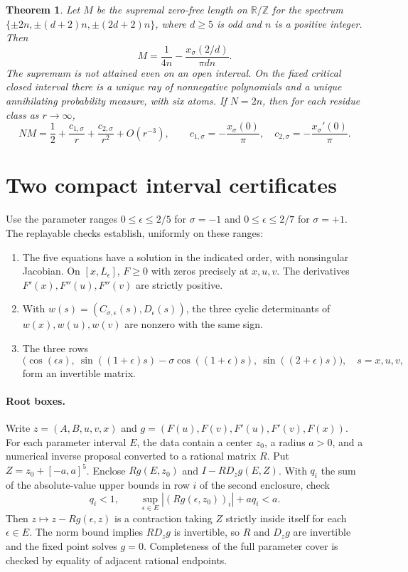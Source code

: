 \documentclass[11pt]{article}
\newtheorem{theorem}{Theorem}
\begin{document}
\begin{theorem}\label{thm:half}
Let \(M\) be the supremal zero-free length on \(\mathbb R/\mathbb Z\)
for the spectrum \(\{\pm 2n,\pm(d+2)n,\pm(2d+2)n\}\), where \(d\ge5\)
is odd and \(n\) is a positive integer. Then
\[
 M=\frac1{4n}-\frac{x_\sigma(2/d)}{\pi dn}.
\]
The supremum is not attained even on an open interval. On the fixed
critical closed interval there is a unique ray of nonnegative
polynomials and a unique annihilating probability measure,
with six atoms. If \(N=2n\), then for each residue class as \(r\to\infty\),
\[
 NM=\frac12+\frac{c_{1,\sigma}}{r}+
               \frac{c_{2,\sigma}}{r^2}+O(r^{-3}),\qquad
 c_{1,\sigma}=-\frac{x_\sigma(0)}{\pi},\quad
 c_{2,\sigma}=-\frac{x_\sigma'(0)}{\pi}.
\]
\end{theorem}

\section{Two compact interval certificates}\label{sec:interval}
Use the parameter ranges \(0\le\epsilon\le 2/5\) for \(\sigma=-1\)
and \(0\le\epsilon\le 2/7\) for \(\sigma=+1\).
The replayable checks establish, uniformly on these ranges:
\begin{enumerate}
\item The five equations have a solution in the indicated order,
with nonsingular Jacobian.
On \([x,L_\epsilon]\), \(F\ge0\) with zeros precisely at \(x,u,v\).
The derivatives \(F'(x),F''(u),F''(v)\) are strictly positive.
\item With \(w(s)=(C_{\sigma,\epsilon}(s),D_\epsilon(s))\), the
three cyclic determinants of \(w(x),w(u),w(v)\) are nonzero with the
same sign.
\item The three rows
\[
 \bigl(\cos(\epsilon s),\
   \sin((1+\epsilon)s)-\sigma\cos((1+\epsilon)s),\
   \sin((2+\epsilon)s)\bigr),\quad s=x,u,v,
\]
form an invertible matrix.
\end{enumerate}

\paragraph{Root boxes.}
Write \(z=(A,B,u,v,x)\) and
\(g=(F(u),F(v),F'(u),F'(v),F(x))\).
For each parameter interval \(E\), the data contain a center \(z_0\),
a radius \(a>0\), and a numerical inverse proposal converted to a
rational matrix \(R\). Put \(Z=z_0+[-a,a]^5\).
Enclose \(Rg(E,z_0)\) and \(I-R D_z g(E,Z)\).
With \(q_i\) the sum of the absolute-value upper bounds in row \(i\)
of the second enclosure, check
\[
 q_i<1,\qquad
 \sup_{\epsilon\in E}|(Rg(\epsilon,z_0))_i|+a q_i<a.
\]
Then \(z\mapsto z-Rg(\epsilon,z)\) is a contraction taking \(Z\)
strictly inside itself for each \(\epsilon\in E\). The norm bound
implies \(R D_zg\) is invertible, so \(R\) and \(D_zg\) are invertible
and the fixed point solves \(g=0\). Completeness of the full parameter
cover is checked by equality of adjacent rational endpoints.
\end{document}
